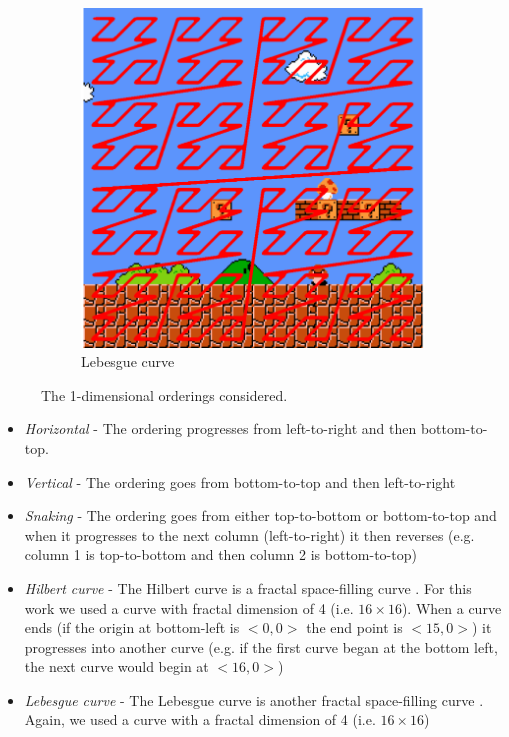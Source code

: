 \documentclass[a4paper]{article}
\begin{document}
\begin{figure}[ht]
\begin{subfigure}[t]{0.18\textwidth}
    \label{fig:hilb}
    \end{subfigure}
    \begin{subfigure}[t]{0.18\textwidth} 
    \includegraphics[width=1\textwidth]{figures/Z_Order.png} 	       \caption{Lebesgue curve}
    \label{fig:zorder}
    \end{subfigure}
    \caption{The 1-dimensional orderings considered.}
    \label{fig:orderings}
\end{figure}


\begin{itemize}
\item \textit{Horizontal} - The ordering progresses from left-to-right and then bottom-to-top.
\item \textit{Vertical} - The ordering goes from bottom-to-top and then left-to-right
\item \textit{Snaking} - The ordering goes from either top-to-bottom or bottom-to-top and when it progresses to the next column (left-to-right) it then reverses (e.g. column 1 is top-to-bottom and then column 2 is bottom-to-top)
\item \textit{Hilbert curve} - The Hilbert curve is a fractal space-filling curve \cite{hilbert1891ueber}.  For this work we used a curve with fractal dimension of 4 (i.e. $16 \times 16$). When a curve ends (if the origin at bottom-left is $<0,0>$ the end point is $<15,0>$) it progresses into another curve (e.g. if the first curve began at the bottom left, the next curve would begin at $<16,0>$)
\item \textit{Lebesgue curve} - The Lebesgue curve is another fractal space-filling curve \cite{morton1966computer}.  Again, we used a curve with a fractal dimension of 4 (i.e. $16 \times 16$)

\end{itemize}
\end{document}
